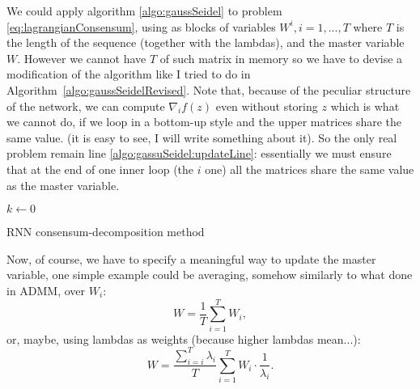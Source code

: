 \documentclass{article}
\begin{document}
We could apply algorithm \ref{algo:gaussSeidel} to problem \ref{eq:lagrangianConsensum}, using as blocks of variables $W^i, i=1,...,T$ where $T$ is the length of the sequence (together with the lambdas), and the master variable $W$.
However we cannot have $T$ of such matrix in memory so we have to devise a modification of the algorithm like I tried to do in Algorithm~\ref{algo:gaussSeidelRevised}. Note that, because of the peculiar structure of the network, we can compute $\nabla_i f(z)$ even without storing $z$ which is what we cannot do, if we loop in a bottom-up style and the upper matrices share the same value. (it is easy to see, I will write something about it). So the only real problem remain line \ref{algo:gassuSeidel:updateLine}: essentially we must ensure that at the end of one inner loop (the $i$ one) all the matrices share the same value as the master variable.


\begin{algorithm}[!h]
	$k \gets 0$\\
	\caption{RNN consensum-decomposition method}
	\label{algo:gaussSeidelRevised}
\end{algorithm}

Now, of course, we have to specify a meaningful way to update the master variable, one simple example could be averaging, somehow similarly to what done in ADMM, over $W_i$:
\begin{equation}
W=\frac{1}{T}\sum_{i=1}^{T}W_i,
\end{equation}
or, maybe, using lambdas as weights (because higher lambdas mean...):
\begin{equation}
W=\frac{\sum_{i=i}^{T} \lambda_i}{T}\sum_{i=1}^{T}W_i\cdot \frac{1}{\lambda_i}.
\end{equation}
\end{document}
